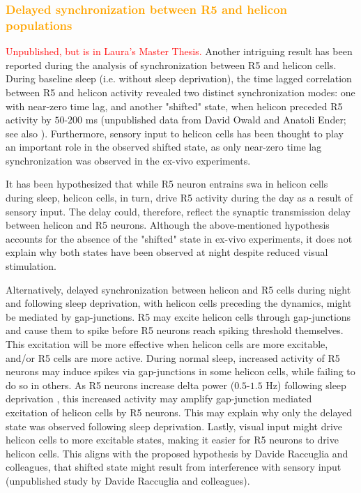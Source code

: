 \documentclass[../main.tex]{subfiles}
\begin{document}
\subsubsection{\textcolor{orange}{Delayed synchronization between R5 and helicon populations}}\label{subsubsec:delayed_synch_r5_helicon}

\textcolor{red}{Unpublished, but is in Laura's Master Thesis.} Another intriguing result has been reported during the analysis of synchronization between R5 and helicon cells. During baseline sleep (i.e. without sleep deprivation), the time lagged correlation between R5 and helicon activity revealed two distinct synchronization modes: one with near-zero time lag, and another "shifted" state, when helicon preceded R5 activity by $50$-$200$ ms (unpublished data from David Owald and Anatoli Ender; see also \cite{krummSlowlyOscillatingBrain2021}).
Furthermore, sensory input to helicon cells has been thought to play an important role in the observed shifted state, as only near-zero time lag synchronization was observed in the ex-vivo experiments.

It has been hypothesized that while R5 neuron entrains \gls{swa} in helicon cells during sleep, helicon cells, in turn, drive R5 activity during the day as a result of sensory input. The delay could, therefore, reflect the synaptic transmission delay between helicon and R5 neurons. Although the above-mentioned hypothesis accounts for the absence of the "shifted" state in ex-vivo experiments, it does not explain why both states have been observed at night despite reduced visual stimulation.

Alternatively, delayed synchronization between helicon and R5 cells during night and following sleep deprivation, with helicon cells preceding the dynamics, might be mediated by gap-junctions.
R5 may excite helicon cells through gap-junctions and cause them to spike before R5 neurons reach spiking threshold themselves. This excitation will be more effective when helicon cells are more excitable, and/or R5 cells are more active.
During normal sleep, increased activity of R5 neurons may induce spikes via gap-junctions in some helicon cells, while failing to do so in others. As R5 neurons increase delta power ($0.5$-$1.5$ Hz) following sleep deprivation \cite{raccugliaNetworkSpecificSynchronizationElectrical2019}, this increased activity may amplify gap-junction mediated excitation of helicon cells by R5 neurons. This may explain why only the delayed state was observed following sleep deprivation. Lastly, visual input might drive helicon cells to more excitable states, making it easier for R5 neurons to drive helicon cells. This aligns with the proposed hypothesis by Davide Raccuglia and colleagues, that shifted state might result from interference with sensory input (unpublished study by Davide Raccuglia and colleagues).
\end{document}
